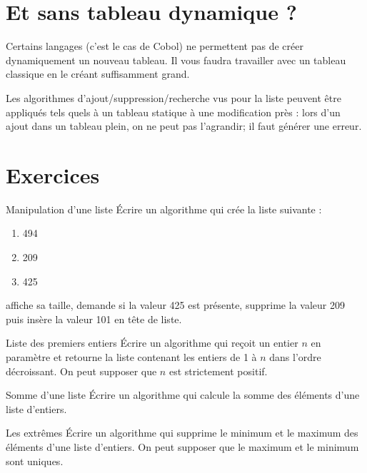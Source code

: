 	
	\section{Et sans tableau dynamique ?}
	
		Certains langages (c’est le cas de Cobol) ne permettent pas de créer
		dynamiquement un nouveau tableau. Il vous faudra travailler avec un
		tableau classique en le créant suffisamment grand.
			
		Les algorithmes d’ajout/suppression/recherche vus pour la liste peuvent
		être appliqués tels quels à un tableau statique à une modification près
		: lors d’un ajout dans un tableau plein, on ne peut pas l’agrandir; il
		faut générer une erreur.
	
	\section{Exercices}
	
		\begin{Exercice}{Manipulation d'une liste}
			Écrire un algorithme qui crée la liste suivante :
			\begin{enumerate}[start=0]
			\item 494
			\item 209
			\item 425
			\end{enumerate}
			affiche sa taille, demande si la valeur 425 est présente, 
			supprime la valeur 209 puis insère la valeur 101 en tête de liste.
		\end{Exercice}
		
		\begin{Exercice}{Liste des premiers entiers}
			Écrire un algorithme qui reçoit un entier $n$ en paramètre et retourne la
			liste contenant les entiers de 1 à $n$ dans l'ordre
			décroissant. On peut supposer que $n$ est strictement positif.
		\end{Exercice}
			
		\begin{Exercice}{Somme d'une liste}
			Écrire un algorithme qui calcule la somme des éléments d’une liste
			d’entiers.
		\end{Exercice}
		
		\begin{Exercice}{Les extrêmes}
				Écrire un algorithme qui supprime le minimum et le maximum des éléments
				d’une liste d’entiers. On peut supposer que le maximum et le minimum
				sont uniques.
		\end{Exercice}
		
